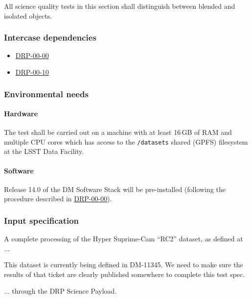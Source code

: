 All science quality tests in this section shall distinguish between blended and isolated objects.

\subsubsection{Intercase dependencies}

\begin{itemize}

  \item{\hyperref[drp-00-00]{DRP-00-00}}
  \item{\hyperref[drp-00-10]{DRP-00-10}}

\end{itemize}

\subsubsection{Environmental needs}

\paragraph{Hardware}

The test shall be carried out on a machine with at least 16\,GB of RAM and
multiple CPU cores which has access to the \texttt{/datasets} shared (GPFS)
filesystem at the LSST Data Facility.

\paragraph{Software}

Release 14.0 of the DM Software Stack will be pre-installed (following the
procedure described in \hyperref[drp-00-00]{DRP-00-00}).

\subsubsection{Input specification}

A complete processing of the Hyper Suprime-Cam ``RC2'' dataset, as defined
at ...

\begin{note}
This dataset is currently being defined in DM-11345. We need to make sure the
results of that ticket are clearly published somewhere to complete this test
spec.

\end{note}

... through the DRP Science Payload.

